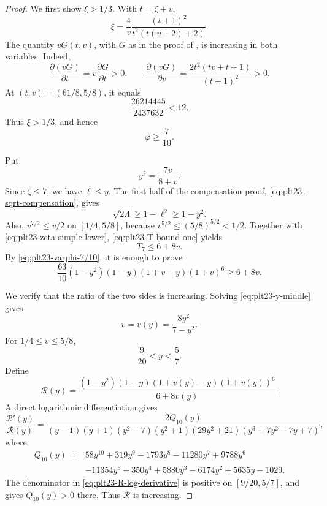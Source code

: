 \documentclass[11pt]{article}
\numberwithin{equation}{section}
\begin{document}
\begin{proof}
  We first show $\xi>1/3$.
  With $t=\zeta+v$,
  \[
    \xi=\frac{4}{v}\frac{(t+1)^2}{t^2(t(v+2)+2)}.
  \]
  The quantity $vG(t,v)$, with $G$ as in the proof of , is increasing in both variables.
  Indeed,
  \[
    \frac{\partial(vG)}{\partial t}=v\frac{\partial G}{\partial t}>0,
    \qquad
    \frac{\partial(vG)}{\partial v}
    =\frac{2t^2(tv+t+1)}{(t+1)^2}>0.
  \]
  At $(t,v)=(61/8,5/8)$, it equals
  \[
    \frac{26214445}{2437632}<12.
  \]
  Thus $\xi>1/3$, and hence
  \begin{equation}\label{eq:plt23-varphi-7/10}
    \varphi\ge\frac{7}{10}.
  \end{equation}

  Put
  \begin{equation}\label{eq:plt23-y-middle}
    y^2=\frac{7v}{8+v}.
  \end{equation}
  Since $\zeta\le7$, we have $\ell\le y$.
  The first half of the compensation proof, \eqref{eq:plt23-sqrt-compensation}, gives
  \[
    \sqrt{2\Lambda}\ge1-\ell^2\ge1-y^2.
  \]
  Also, $v^{7/2}\le v/2$ on $[1/4,5/8]$, because $v^{5/2}\le(5/8)^{5/2}<1/2$.
  Together with \eqref{eq:plt23-zeta-simple-lower}, \eqref{eq:plt23-T-bound-one} yields
  \begin{equation}\label{eq:plt23-T7-middle}
    T_7\le6+8v.
  \end{equation}
  By \eqref{eq:plt23-varphi-7/10}, it is enough to prove
  \begin{equation}\label{eq:plt23-middle-target}
    \frac{63}{10}(1-y^2)(1-y)(1+v-y)(1+v)^6
    \ge6+8v.
  \end{equation}

  We verify that the ratio of the two sides is increasing.
  Solving \eqref{eq:plt23-y-middle} gives
  \[
    v=v(y)=\frac{8y^2}{7-y^2}.
  \]
  For $1/4\le v\le5/8$,
  \[
    \frac{9}{20}<y<\frac{5}{7}.
  \]
  Define
  \[
    \mathcal R(y)=
    \frac{(1-y^2)(1-y)(1+v(y)-y)(1+v(y))^6}
    {6+8v(y)}.
  \]
  A direct logarithmic differentiation gives
  \begin{equation}\label{eq:plt23-R-log-derivative}
    \frac{\mathcal R'(y)}{\mathcal R(y)}
    =\frac{2Q_{10}(y)}
    {(y-1)(y+1)(y^2-7)(y^2+1)(29y^2+21)
    (y^3+7y^2-7y+7)},
  \end{equation}
  where
  \begin{align}
    Q_{10}(y)={}&58y^{10}+319y^9-1793y^8-11280y^7+9788y^6\\
    &-11354y^5+350y^4+5880y^3-6174y^2+5635y-1029.
    \label{eq:plt23-Q10}
  \end{align}
  The denominator in \eqref{eq:plt23-R-log-derivative} is positive on $[9/20,5/7]$, and  gives $Q_{10}(y)>0$ there.
  Thus $\mathcal R$ is increasing.


\end{proof}
\end{document}
